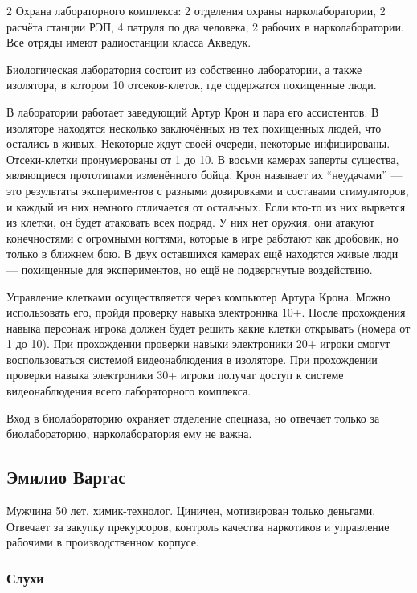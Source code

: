 \documentclass[twoside]{article}
\begin{document}
\begin{multicols}{2}
Охрана лабораторного комплекса: 2 отделения охраны нарколаборатории, 2
расчёта станции РЭП, 4 патруля по два человека, 2 рабочих в
нарколаборатории. Все отряды имеют радиостанции класса Акведук.

Биологическая лаборатория состоит из собственно лаборатории, а также
изолятора, в котором 10 отсеков-клеток, где содержатся похищенные люди.

В лаборатории работает заведующий Артур Крон и пара его ассистентов. В
изоляторе находятся несколько заключённых из тех похищенных людей, что
остались в живых. Некоторые ждут своей очереди, некоторые инфицированы.
Отсеки-клетки пронумерованы от 1 до 10. В восьми камерах заперты
существа, являющиеся прототипами изменённого бойца. Крон называет их
\enquote{неудачами} --- это результаты экспериментов с разными дозировками и
составами стимуляторов, и каждый из них немного отличается от остальных.
Если кто-то из них вырвется из клетки, он будет атаковать всех подряд.
У них нет оружия, они атакуют конечностями с огромными когтями, которые в игре
работают как дробовик, но только в ближнем бою. В двух оставшихся камерах ещё находятся живые
люди --- похищенные для экспериментов, но ещё не подвергнутые воздействию.

Управление клетками осуществляется через компьютер Артура Крона. Можно
использовать его, пройдя проверку навыка электроника 10+. После прохождения
навыка персонаж игрока должен будет решить какие клетки открывать
(номера от 1 до 10). При прохождении проверки навыки электроники 20+ игроки
смогут воспользоваться системой видеонаблюдения в изоляторе. При прохождении
проверки навыка электроники 30+ игроки получат доступ к системе видеонаблюдения
всего лабораторного комплекса.

Вход в биолабораторию охраняет отделение спецназа, но отвечает только за
биолабораторию, нарколаборатория ему не важна.

\subsection{Эмилио Варгас}\label{emilio-vargas}

Мужчина 50 лет, химик-технолог. Циничен, мотивирован только деньгами.
Отвечает за закупку прекурсоров, контроль качества наркотиков и
управление рабочими в производственном корпусе.

\subsubsection{Слухи}\label{rumors-vargas}


\end{multicols}
\end{document}
